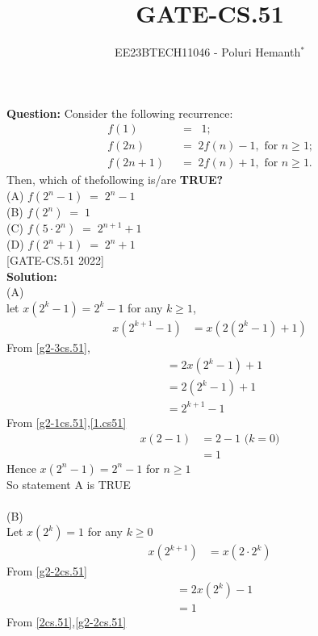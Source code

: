 \documentclass[journal,12pt,twocolumn]{IEEEtran}
\theoremstyle{remark}
\begin{document}

\vspace{3cm}

\title{GATE-CS.51}
\author{EE23BTECH11046 - Poluri Hemanth$^{*}$}
\maketitle
\textbf{Question:}
Consider the following recurrence:
\begin{align}
	f(1)\;\;&=\;\;1;\label{g2-1cs.51}\\
	 f(2n)\;\;&=\;2f(n)-1,\text{  for $n\geq$1;}\label{g2-2cs.51}\\
	 f(2n+1)\;\;&=\;2f(n)+1,\text{  for $n\geq$1.}\label{g2-3cs.51}
\end{align}
Then, which of thefollowing is/are \textbf{TRUE?}\\
(A) $f(2^n-1)\;=\;2^n-1$\\
(B) $f(2^n)\;=\;1$\\
(C) $f(5\cdot2^n)\;=\;2^{n+1}+1$\\
(D) $f(2^n+1)\;=\;2^n+1$\\
\hfill{[GATE-CS.51 2022]}\\
\textbf{Solution:}\\
\fi
(A)\\
let $x(2^k-1)=2^k-1$ for any $k\geq1$,
\begin{align}
	x(2^{k+1}-1)&=x(2(2^k-1)+1)
\end{align}
From \eqref{g2-3cs.51},
\begin{align}
	&=2x(2^k-1)+1\\
        &=2(2^k-1)+1\\
	&=2^{k+1}-1\label{1.cs51}
\end{align}
From \eqref{g2-1cs.51},\eqref{1.cs51}
\begin{align}
	x(2-1)&=2-1\text{  ($k=0$)}\\
	&=1
\end{align}
Hence $x(2^n-1)=2^n-1$ for $n\geq1$\\
So statement A is TRUE\\
\\(B)\\
Let $x(2^k)=1$ for any $k\geq$0
\begin{align}
	x(2^{k+1})&=x(2\cdot2^k)
\end{align}
From \eqref{g2-2cs.51}
\begin{align}
	&=2x(2^k)-1\label{2cs.51}\\
	&=1
\end{align}
From \eqref{2cs.51},\eqref{g2-2cs.51}
\end{document}
